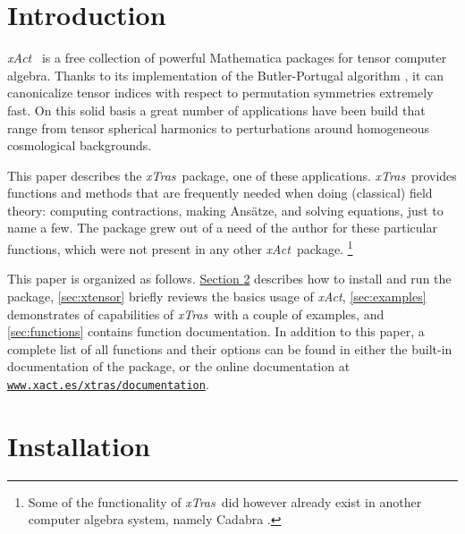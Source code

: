 \documentclass[a4paper,11pt,english]{article}
\newcommand{\xAct}{\emph{xAct}}
\newcommand{\xTras}{\emph{xTras}}
\begin{document}
\newpage
\pagestyle{plain}




\tableofcontents

\section{Introduction}

\xAct~\cite{MartinGarcia:2002xa} is a free collection of powerful Mathematica packages for tensor 
computer algebra. Thanks to its implementation \cite{MartinGarcia:2008,MartinGarcia:2002} 
of the Butler-Portugal algorithm \cite{Portugal:1998qi, Portugal:1999, Manssur:2002}, 
it can canonicalize tensor indices with respect to permutation symmetries extremely fast. On this
solid basis a great number of applications have been build \cite{Brizuela:2008ra,Brizuela:2006,MartinGarcia:2007ab,
MartinGarcia:2008qz,GomezLobo:2011xv,Backdahl:2013,Pitrou:2013hga} that range from tensor spherical harmonics
to perturbations around homogeneous cosmological backgrounds.

This paper describes the \xTras~package, one of these applications. \xTras~provides functions
and methods that are frequently needed when doing (classical) field theory: computing contractions,
making Ans\"atze, and solving equations, just to name a few. The package grew out of a need of the 
author for these particular functions, which were not present in any other \xAct~package.%
\footnote{
Some of the functionality of \xTras~did however already exist in another computer algebra system, 
namely Cadabra \cite{Peeters:2007wn}.
}

This paper is organized as follows. \hyperref[sec:installation]{Section \ref*{sec:installation}}
describes how to install and run
the package, \autoref{sec:xtensor} briefly reviews the basics usage of \xAct, 
\autoref{sec:examples} demonstrates of capabilities of \xTras~with a couple of examples,
and \autoref{sec:functions} contains function documentation. In addition to this paper,
a complete list of all functions and their options can be found in either the built-in
documentation of the package, or the online documentation at 
\href{http://www.xact.es/xtras/documentation/}{\texttt{www.xact.es/xtras/documentation}}.




\section{Installation}
\label{sec:installation}
\end{document}
